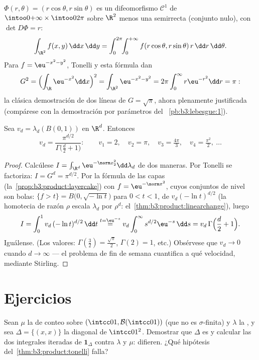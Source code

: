 \begin{example}
\label{ex:b3:product:polar}
$\Phi(r, \theta) = (r\cos\theta, r\sin\theta)$ es un difeomorfismo
$\mathcal
C^1$ de $\intoo0{+\infty}\times\intoo0{2\pi}$ sobre $\R^2$ menos una
semirrecta (conjunto nulo), con $\det D\Phi =
r$:
\[
\int_{\R^2}f(x, y)\,\dd x\,\dd y
= \int_0^{2\pi}\!\!\int_0^{+\infty}
f(r\cos\theta, r\sin\theta)\,r\,\dd r\,\dd\theta .
\]
Para $f = \eu^{-x^2-y^2}$, Tonelli y esta fórmula dan
\[
G^2 = \Bigl(\int_\R \eu^{-x^2}\dd x\Bigr)^2
= \int_{\R^2}\eu^{-x^2-y^2}
= 2\pi\int_0^\infty r\eu^{-r^2}\dd r = \pi:
\]
la clásica demostración de dos líneas de $G = \sqrt\pi$, ahora
plenamente justificada (compárese con la demostración por parámetros
del~
\cref{pb:b3:lebesgue:1}).
\end{example}

\begin{theorem}
\label{thm:b3:product:ballvolume}
Sea $v_d = \lambda_d(B(0,1))$ en $\R^d$. Entonces
\[
v_d = \frac{\pi^{d/2}}{\Gamma\bigl(\frac d2 + 1\bigr)} :
\qquad
v_1 = 2,\quad v_2 = \pi,\quad v_3 = \tfrac{4\pi}3,\quad
v_4 = \tfrac{\pi^2}2,\ \dots
\]
\end{theorem}

\begin{proof}
Calcúlese $I = \int_{\R^d}\eu^{-\norm x_2^2}\dd\lambda_d$ de dos
maneras. Por Tonelli se factoriza: $I = G^d = \pi^{d/2}$. Por la fórmula
de las capas (la~\cref{prop:b3:product:layercake}) con $f = \eu^{-
\norm x^2}$, cuyos conjuntos de nivel son bolas: $\{f > t\} =
B\bigl(0, \sqrt{-\ln t}\bigr)$ para $0 < t < 1$, de
 $v_d(-\ln t)^{d/2}$ (la
homotecia de razón $\rho$ escala $\lambda_d$ por $\rho^d$:
el~\cref{thm:b3:product:linearchange}), luego
\[
I = \int_0^1 v_d\,(-\ln t)^{d/2}\,\dd t
\overset{t = \eu^{-s}}{=}
v_d\int_0^\infty s^{d/2}\eu^{-s}\,\dd s
= v_d\,\Gamma\Bigl(\frac d2 + 1\Bigr).
\]
Iguálense. (Los valores: $\Gamma(\frac32) = \frac{\sqrt\pi}2$,
$\Gamma(2) = 1$, etc.) Obsérvese que $v_d \to 0$ cuando $d \to \infty$
--- el problema de fin de semana cuantifica a qué velocidad, mediante
Stirling.
\end{proof}

\section{Ejercicios}

\begin{exercise}[$\star$]\label{exo:b3:product:1}
Sean $\mu$ la  de conteo sobre
$(\intcc01, \mathcal
B(\intcc01))$ (que no es $\sigma$-finita) y $\lambda$ la
, y sea
$\Delta = \{(x,x)\}$ la diagonal de $\intcc01^2$. Demostrar que $\Delta$
es  y calcular las dos
integrales iteradas de $\mathbf 1_\Delta$ contra $\lambda$ y $\mu$:
difieren. ¿Qué hipótesis del~\cref{thm:b3:product:tonelli} falla?
\end{exercise}

